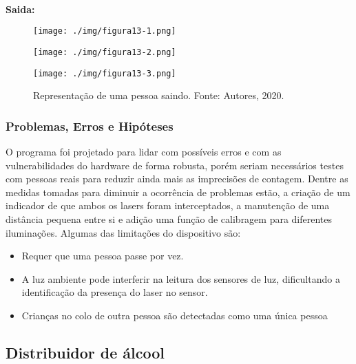 \documentclass[10pt,twocolumn,letterpaper]{article}
\begin{document}
\noindent
\\
\textbf{Saida:}

{
\begin{figure}[!h]
    \begin{minipage}[!]{0.31\linewidth}
    \texttt{[image: ./img/figura13-1.png]}
    \end{minipage}
    \begin{minipage}[!]{0.31\linewidth}
    \texttt{[image: ./img/figura13-2.png]}
    \end{minipage}
    \begin{minipage}[!]{0.31\linewidth}
    \texttt{[image: ./img/figura13-3.png]}
    \end{minipage}
    \caption{ Representação de uma pessoa saindo. \newline \centering Fonte: Autores, 2020.}
\label{fig:figura13}
\end{figure}
}


\subsubsection{Problemas, Erros e Hipóteses}

O programa foi projetado para lidar com possíveis erros e com as vulnerabilidades do hardware de forma robusta, porém seriam necessários testes com pessoas reais para reduzir ainda mais as imprecisões de contagem. Dentre as medidas tomadas para diminuir a ocorrência de problemas estão, a criação de um indicador de que ambos os lasers foram interceptados, a manutenção de uma distância pequena entre si e adição uma função de calibragem para diferentes iluminações.   Algumas das limitações do dispositivo são: 

\begin{itemize}
  \item Requer que uma pessoa passe por vez.
  \item A luz ambiente pode interferir na leitura dos sensores de luz, dificultando a identificação da presença do laser no sensor.
  \item Crianças no colo de outra pessoa são detectadas como uma única pessoa
\end{itemize}

\subsection{Distribuidor de álcool}
\end{document}
